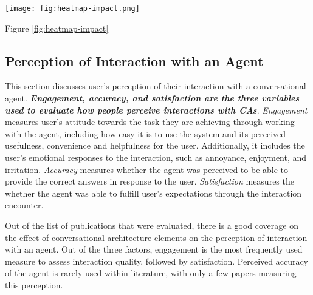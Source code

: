 \documentclass[sigconf,screen,review, anonymous]{acmart}
\begin{document}
\begin{figure*}[h]
  \centering
  \texttt{[image: fig:heatmap-impact.png]}
  \caption{Heatmap of literature for perception of conversational agents for each type of conversational architecture element.}
  \label{fig:heatmap-impact}
\end{figure*}

Figure \ref{fig:heatmap-impact}


\subsection{Perception of Interaction with an Agent}

This section discusses user's perception of their interaction with a conversational agent. \textbf{\textit{Engagement, accuracy, and satisfaction are the three variables used to evaluate how people perceive interactions with CAs}}. \textit{Engagement} measures user's attitude towards the task they are achieving through working with the agent, including how easy it is to use the system and its perceived usefulness, convenience and helpfulness for the user. Additionally, it includes the user's emotional responses to the interaction, such as annoyance, enjoyment, and irritation. \textit{Accuracy} measures whether the agent was perceived to be able to provide the correct answers in response to the user. \textit{Satisfaction} measures the whether the agent was able to fulfill user's expectations through the interaction encounter.

Out of the list of publications that were evaluated, there is a good coverage on the effect of conversational architecture elements on the perception of interaction with an agent. Out of the three factors, engagement is the most frequently used measure to assess interaction quality, followed by satisfaction. Perceived accuracy of the agent is rarely used within literature, with only a few papers measuring this perception. 
\end{document}
